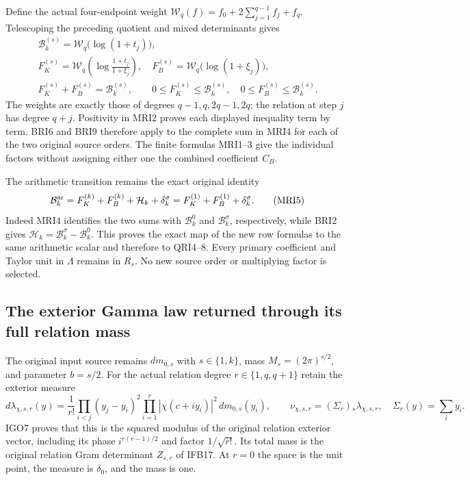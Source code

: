\documentclass[11pt,a4paper]{article}
\begin{document}
Define the actual four-endpoint weight
$\mathcal W_q(f)=f_0+2\sum_{j=1}^{q-1}f_j+f_q$. Telescoping
the preceding quotient and mixed determinants gives
\[
\begin{gathered}
 \mathcal B_k^{(s)}=\mathcal W_q\bigl(\log(1+t_j)\bigr),\\
 F_K^{(s)}=\mathcal W_q\left(\log\frac{1+t_j}{1+\xi_j}\right),
 \quad F_B^{(s)}=\mathcal W_q\bigl(\log(1+\xi_j)\bigr),\\
 F_K^{(s)}+F_B^{(s)}=\mathcal B_k^{(s)},\qquad
 0\le F_K^{(s)}\le\mathcal B_k^{(s)},\quad
 0\le F_B^{(s)}\le\mathcal B_k^{(s)}.
\end{gathered}\tag{MRI4}
\]
The weights are exactly those of degrees $q-1,q,2q-1,2q$;
the relation at step $j$ has degree $q+j$. Positivity in MRI2
proves each displayed inequality term by term. BRI6 and BRI9
therefore apply to the complete sum in MRI4 for each of the
two original source orders. The finite formulas MRI1--3 give
the individual factors without assigning either one the combined
coefficient $C_B$.

The arithmetic transition remains the exact original identity
\[
 \mathcal B_k^{\rm ar}
   =F_K^{(k)}+F_B^{(k)}+\mathcal H_k+\delta_k^\sigma
   =F_K^{(1)}+F_B^{(1)}+\delta_k^\sigma.
 \tag{MRI5}
\]
Indeed MRI4 identifies the two sums with $\mathcal B_k^0$ and
$\mathcal B_k^\sigma$, respectively, while BRI2 gives
$\mathcal H_k=\mathcal B_k^\sigma-\mathcal B_k^0$.
This proves the exact map of the new row formulas to the same
arithmetic scalar and therefore to QRI4--8. Every primary
coefficient and Taylor unit in $\Lambda$ remains in $R_s$.
No new source order or multiplying factor is selected.

\subsection{The exterior Gamma law returned through its full relation mass}

The original input source remains $dm_{0,s}$ with $s\in\{1,k\}$,
mass $M_s=(2\pi)^{s/2}$, and parameter $b=s/2$. For the actual
relation degree $r\in\{1,q,q+1\}$ retain the exterior measure
\[
 d\lambda_{\chi,s,r}(y)=\frac1{r!}
       \prod_{i<j}(y_j-y_i)^2
       \prod_{i=1}^r|\chi(c+iy_i)|^2\,dm_{0,s}(y_i),
 \qquad \nu_{\chi,s,r}=(\Sigma_r)_*\lambda_{\chi,s,r},
 \quad \Sigma_r(y)=\sum_i y_i.
 \tag{IRI1}
\]
IGO7 proves that this is the squared modulus of the original
relation exterior vector, including its phase
$i^{r(r-1)/2}$ and factor $1/\sqrt{r!}$. Its total mass is the
original relation Gram determinant $Z_{s,r}$ of IFB17. At $r=0$
the space is the unit point, the measure is $\delta_0$, and the
mass is one.
\end{document}
